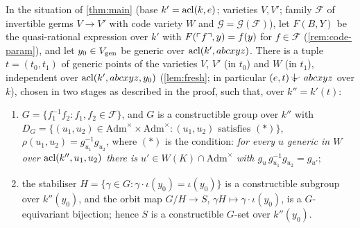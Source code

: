 \begin{theorem}\label{thm:constructible}
In the situation of \cref{thm:main} (base $k'=\operatorname{acl}(k,e)$; varieties $V,V'$; family
$\mathcal F$ of invertible germs $V\to V'$ with code variety $W$ and
$\mathcal G=\mathcal G(\mathcal F)$), let $F(B,Y)$ be the quasi-rational expression over
$k'$ with $F(\ulcorner f\urcorner,y)=f(y)$ for $f\in\mathcal F$ (\cref{rem:code-param}), and let
$y_0\in V_{\operatorname{gen}}$ be generic over $\operatorname{acl}(k',abcxyz)$.  There is a tuple $t=(t_0,t_1)$ of generic points of the varieties $V$, $V'$ (in $t_0$) and
$W$ (in $t_1$), independent over $\operatorname{acl}(k',abcxyz,y_0)$ (\cref{lem:fresh}; in particular
$(e,t)\ind{}abcxyz$ over $k$), chosen in two stages as described in the proof, such that,
over $k''=k'(t)$:
\begin{enumerate}[nosep]
\item $G=\{f_1^{-1}f_2: f_1,f_2\in\mathcal F\}$, and $G$ is a constructible group over $k''$
  with $D_G=\{(u_1,u_2)\in\mathrm{Adm}^\times\times\mathrm{Adm}^\times:
  (u_1,u_2)\text{ satisfies }(\ast)\}$, $\rho(u_1,u_2)=g_{u_1}^{-1}g_{u_2}$, where
  $(\ast)$ is the condition: \emph{for every $u$ generic in $W$ over $\operatorname{acl}(k'',u_1,u_2)$
  there is $u'\in W(K)\cap\mathrm{Adm}^\times$ with $g_u\,g_{u_1}^{-1}g_{u_2}=g_{u'}$};
\item the stabiliser $H=\{\gamma\in G:\gamma\cdot\iota(y_0)=\iota(y_0)\}$ is a constructible
  subgroup over $k''(y_0)$, and the orbit map $G/H\to S$, $\gamma H\mapsto\gamma\cdot\iota(y_0)$,
  is a $G$-equivariant bijection; hence $S$ is a constructible $G$-set over $k''(y_0)$.
\end{enumerate}
\end{theorem}
